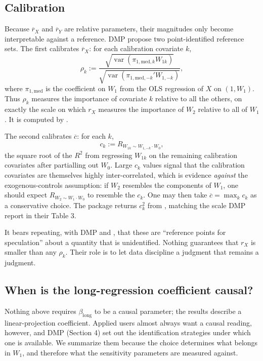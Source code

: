 \documentclass[article]{jss}\usepackage[]{graphicx}\usepackage[]{xcolor}
\newcommand{\blong}{\beta_{\mathrm{long}}}
\newcommand{\rxbar}{\ensuremath{\overline{r}_X}}
\newcommand{\rybar}{\ensuremath{\overline{r}_Y}}
\newcommand{\cbar}{\ensuremath{\overline{c}}}
\newcommand{\Var}{\operatorname{var}}
\begin{document}
\subsection{Calibration}\label{sec:calib}

Because $\rxbar$ and $\rybar$ are relative parameters, their magnitudes
only become interpretable against a reference. DMP propose two
point-identified reference sets. The first calibrates $\rxbar$: for each
calibration covariate $k$,
\begin{equation}
\rho_k := \frac{\sqrt{\Var(\pi_{1,\mathrm{med},k} W_{1k})}}
                {\sqrt{\Var(\pi_{1,\mathrm{med},-k}' W_{1,-k})}},
\label{eq:rhok}
\end{equation}
where $\pi_{1,\mathrm{med}}$ is the coefficient on $W_1$ from the OLS
regression of $X$ on $(1, W_1)$. Thus $\rho_k$ measures the importance of
covariate $k$ relative to all the others, on exactly the scale on which
$r_X$ measures the importance of $W_2$ relative to all of $W_1$. It is
computed by .

The second calibrates $\cbar$: for each $k$,
\begin{equation}
c_k := R_{W_{1k} \sim W_{1,-k} \cdot W_0},
\label{eq:ck}
\end{equation}
the square root of the $R^2$ from regressing $W_{1k}$ on the remaining
calibration covariates after partialling out $W_0$. Large $c_k$ values
signal that the calibration covariates are themselves highly
inter-correlated, which is evidence \emph{against} the exogenous-controls
assumption: if $W_2$ resembles the components of $W_1$, one should expect
$R_{W_2 \sim W_1 \cdot W_0}$ to resemble the $c_k$. One may then take
$\cbar = \max_k c_k$ as a conservative choice. The package returns
$c_k^2$ from , matching the scale DMP
report in their Table 3.

It bears repeating, with DMP and \citet{Hosman2010}, that these are
``reference points for speculation'' about a quantity that is unidentified.
Nothing guarantees that $r_X$ is smaller than any $\rho_k$. Their role is
to let data discipline a judgment that remains a judgment.

\subsection{When is the long-regression coefficient causal?}
\label{sec:causal}

Nothing above requires $\blong$ to be a causal parameter; the results
describe a linear-projection coefficient. Applied users almost always want
a causal reading, however, and DMP (Section 4) set out the identification
strategies under which one is available. We summarize them because the
choice determines what belongs in $W_1$, and therefore what the sensitivity
parameters are measured against.
\end{document}
